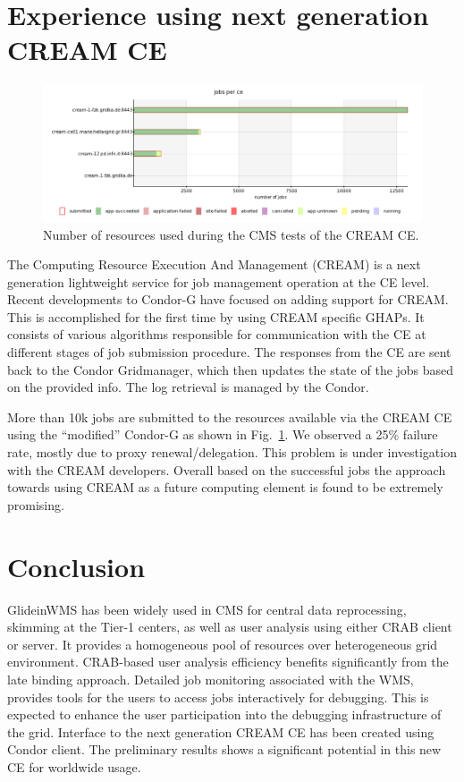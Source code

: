 \documentclass[a4paper]{jpconf}
\begin{document}
\section{Experience using next generation CREAM CE}
\begin{figure}
\begin{center}
\includegraphics[scale=0.45]{cms_cream}
\end{center}
\caption{Number of resources used during the CMS tests of the CREAM CE.}
\label{fig:cms_cream}
\end{figure}
The Computing Resource Execution And Management (CREAM) is a next generation lightweight service 
for job management operation at the CE level. Recent developments to Condor-G have focused on adding 
support for CREAM. This is accomplished for the first time by using CREAM specific GHAPs. It consists 
of various algorithms responsible for communication with the CE at different stages of job submission
procedure. The responses from the CE are sent back to the Condor Gridmanager, which then updates 
the state of the jobs based on the provided info. The log retrieval is managed by the Condor.

More than 10k jobs are submitted to the resources available via the CREAM CE using the ``modified'' Condor-G as 
shown in Fig.~\ref{fig:cms_cream}. We observed a 25\% failure rate, mostly due to proxy renewal/delegation. 
This problem is under investigation with the CREAM developers. Overall based on the successful jobs
the approach towards using CREAM as a future computing element is found to be extremely promising.
\section{Conclusion}
GlideinWMS has been widely used in CMS for central data reprocessing, skimming at the Tier-1 centers, as well
as user analysis using either CRAB client or server. It provides a homogeneous pool of resources over
heterogeneous grid environment. CRAB-based user analysis efficiency benefits significantly from the late
binding approach. Detailed job monitoring associated with the WMS, provides tools for the users to access 
jobs interactively for debugging. This is expected to enhance the user participation into the debugging 
infrastructure of the grid. Interface to the next generation CREAM CE has been created using Condor client. 
The preliminary results shows a significant potential in this new CE for worldwide usage. 
\end{document}
